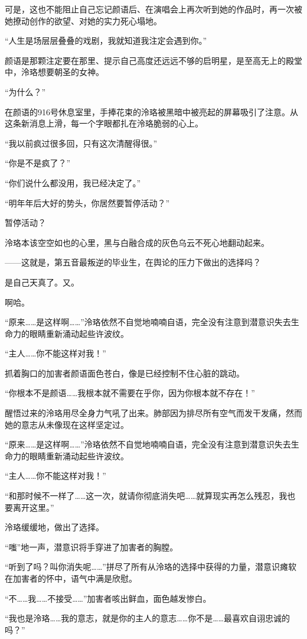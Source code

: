 \documentclass[UTF8, scheme = chinese, openany]{ctexbook}
\begin{document}
可是，这也不能阻止自己忘记颜语后、在演唱会上再次听到她的作品时，再一次被她撩动创作的欲望、对她的实力死心塌地。

“人生是场层层叠叠的戏剧，我就知道我注定会遇到你。”

颜语是那颗注定要在那里、提示自己高度还远远不够的启明星，是至高无上的殿堂中，泠珞想要朝圣的女神。

“为什么？”

在颜语的916号休息室里，手捧花束的泠珞被黑暗中被亮起的屏幕吸引了注意。从这条新消息上滑，每一个字眼都扎在泠珞脆弱的心上。

“我以前疯过很多回，只有这次清醒得很。”

“你是不是疯了？”

“你们说什么都没用，我已经决定了。”

“明年年后大好的势头，你居然要暂停活动？”

暂停活动？

泠珞本该空空如也的心里，黑与白融合成的灰色乌云不死心地翻动起来。

——这就是，第五音最叛逆的毕业生，在舆论的压力下做出的选择吗？

是自己天真了。又。

啊哈。

“原来……是这样啊……”泠珞依然不自觉地喃喃自语，完全没有注意到潜意识失去生命力的眼睛重新涌动起些许波纹。

“主人……你不能这样对我！”

抓着胸口的加害者颜语面色苍白，像是已经控制不住心脏的跳动。

“你根本不是颜语……我根本就不需要在乎你，因为你根本就不存在！”

醒悟过来的泠珞用尽全身力气吼了出来。肺部因为排尽所有空气而发干发痛，然而她的意志从未像现在这样坚定过。

“原来……是这样啊……”泠珞依然不自觉地喃喃自语，完全没有注意到潜意识失去生命力的眼睛重新涌动起些许波纹。

“主人……你不能这样对我！”

“和那时候不一样了……这一次，就请你彻底消失吧……就算现实再怎么残忍，我也要离开这里。”

泠珞缓缓地，做出了选择。

“嗤”地一声，潜意识将手穿进了加害者的胸膛。

“听到了吗？叫你消失呢……”拼尽了所有从泠珞的选择中获得的力量，潜意识瘫软在加害者的怀中，语气中满是欣慰。

“不……我……不接受……”加害者咳出鲜血，面色越发惨白。

“我也是泠珞……我的意志，就是你的主人的意志……你不是……最喜欢自诩忠诚的吗？”
\end{document}
